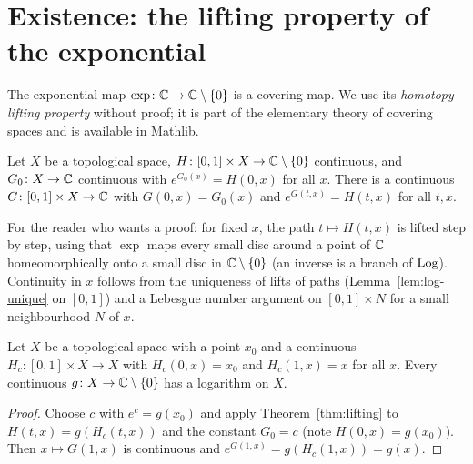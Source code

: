 
\section{Existence: the lifting property of the exponential}

The exponential map $\exp\colon\mathbb{C}\to\mathbb{C}\setminus\left\{ 0 \right\}$ is a covering map. We use its
\emph{homotopy lifting property} without proof; it is part of the elementary theory of covering
spaces and is available in Mathlib.

\begin{theorem}\label{thm:lifting}
Let $X$ be a topological space, $H\colon[0,1]\times X\to\mathbb{C}\setminus\left\{ 0 \right\}$ continuous, and
$G_0\colon X\to\mathbb{C}$ continuous with $e^{G_0(x)}=H(0,x)$ for all $x$. There is a continuous
$G\colon[0,1]\times X\to\mathbb{C}$ with $G(0,x)=G_0(x)$ and $e^{G(t,x)}=H(t,x)$ for all $t,x$.
\end{theorem}


\begin{remark}
For the reader who wants a proof: for fixed $x$, the path $t\mapsto H(t,x)$ is lifted step by
step, using that $\exp$ maps every small disc around a point of $\mathbb{C}$ homeomorphically onto a small
disc in $\mathbb{C}\setminus\left\{ 0 \right\}$ (an inverse is a branch of $\operatorname{Log}$). Continuity in $x$ follows from the
uniqueness of lifts of paths (Lemma~\ref{lem:log-unique} on $[0,1]$) and a Lebesgue number
argument on $[0,1]\times N$ for a small neighbourhood $N$ of $x$.
\end{remark}

\begin{theorem}\label{thm:contractible}
Let $X$ be a topological space with a point $x_0$ and a continuous $H_c\colon[0,1]\times X\to X$
with $H_c(0,x)=x_0$ and $H_c(1,x)=x$ for all $x$. Every continuous $g\colon X\to\mathbb{C}\setminus\left\{ 0 \right\}$
has a logarithm on $X$.
\end{theorem}

\begin{proof}
Choose $c$ with $e^c=g(x_0)$ and apply Theorem~\ref{thm:lifting} to $H(t,x)=g(H_c(t,x))$ and the
constant $G_0=c$ (note $H(0,x)=g(x_0)$). Then $x\mapsto G(1,x)$ is continuous and
$e^{G(1,x)}=g(H_c(1,x))=g(x)$.
\end{proof}


